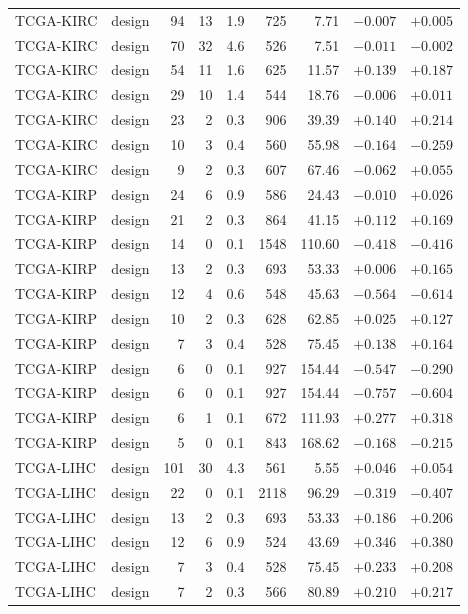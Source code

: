 \begin{longtable}{@{}llrrrrrrr@{}}
TCGA-KIRC & design & 94 & 13 & 1.9 & 725 & 7.71 & $-0.007$ & $+0.005$\\
TCGA-KIRC & design & 70 & 32 & 4.6 & 526 & 7.51 & $-0.011$ & $-0.002$\\
TCGA-KIRC & design & 54 & 11 & 1.6 & 625 & 11.57 & $+0.139$ & $+0.187$\\
TCGA-KIRC & design & 29 & 10 & 1.4 & 544 & 18.76 & $-0.006$ & $+0.011$\\
TCGA-KIRC & design & 23 & 2 & 0.3 & 906 & 39.39 & $+0.140$ & $+0.214$\\
TCGA-KIRC & design & 10 & 3 & 0.4 & 560 & 55.98 & $-0.164$ & $-0.259$\\
TCGA-KIRC & design & 9 & 2 & 0.3 & 607 & 67.46 & $-0.062$ & $+0.055$\\
TCGA-KIRP & design & 24 & 6 & 0.9 & 586 & 24.43 & $-0.010$ & $+0.026$\\
TCGA-KIRP & design & 21 & 2 & 0.3 & 864 & 41.15 & $+0.112$ & $+0.169$\\
TCGA-KIRP & design & 14 & 0 & 0.1 & 1548 & 110.60 & $-0.418$ & $-0.416$\\
TCGA-KIRP & design & 13 & 2 & 0.3 & 693 & 53.33 & $+0.006$ & $+0.165$\\
TCGA-KIRP & design & 12 & 4 & 0.6 & 548 & 45.63 & $-0.564$ & $-0.614$\\
TCGA-KIRP & design & 10 & 2 & 0.3 & 628 & 62.85 & $+0.025$ & $+0.127$\\
TCGA-KIRP & design & 7 & 3 & 0.4 & 528 & 75.45 & $+0.138$ & $+0.164$\\
TCGA-KIRP & design & 6 & 0 & 0.1 & 927 & 154.44 & $-0.547$ & $-0.290$\\
TCGA-KIRP & design & 6 & 0 & 0.1 & 927 & 154.44 & $-0.757$ & $-0.604$\\
TCGA-KIRP & design & 6 & 1 & 0.1 & 672 & 111.93 & $+0.277$ & $+0.318$\\
TCGA-KIRP & design & 5 & 0 & 0.1 & 843 & 168.62 & $-0.168$ & $-0.215$\\
TCGA-LIHC & design & 101 & 30 & 4.3 & 561 & 5.55 & $+0.046$ & $+0.054$\\
TCGA-LIHC & design & 22 & 0 & 0.1 & 2118 & 96.29 & $-0.319$ & $-0.407$\\
TCGA-LIHC & design & 13 & 2 & 0.3 & 693 & 53.33 & $+0.186$ & $+0.206$\\
TCGA-LIHC & design & 12 & 6 & 0.9 & 524 & 43.69 & $+0.346$ & $+0.380$\\
TCGA-LIHC & design & 7 & 3 & 0.4 & 528 & 75.45 & $+0.233$ & $+0.208$\\
TCGA-LIHC & design & 7 & 2 & 0.3 & 566 & 80.89 & $+0.210$ & $+0.217$\\

\end{longtable}
